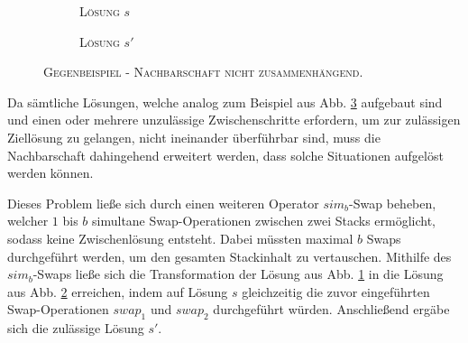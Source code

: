 \begin{figure}[H]
  \begin{subfigure}[b]{0.5\textwidth}
  \centering
    \caption{\textsc{Lösung $s$}}
    \label{fig:counter_a}
  \end{subfigure}
  \hfill
  \begin{subfigure}[b]{0.5\textwidth}
  \centering
    \caption{\textsc{Lösung $s'$}}
    \label{fig:counter_b}
  \end{subfigure}
  \caption{\textsc{Gegenbeispiel - Nachbarschaft nicht zusammenhängend.}}
  \label{fig:counter_example_stacks}
\end{figure}

Da sämtliche Lösungen, welche analog zum Beispiel aus Abb. \ref{fig:counter_example_stacks} aufgebaut sind und einen oder mehrere unzulässige Zwischenschritte erfordern, um zur zulässigen Ziellösung zu gelangen, nicht ineinander überführbar sind, muss die Nachbarschaft dahingehend erweitert werden, dass solche Situationen aufgelöst werden können.

Dieses Problem ließe sich durch einen weiteren Operator $sim_b$-Swap beheben, welcher $1$ bis $b$ simultane Swap-Operationen
zwischen zwei Stacks ermöglicht, sodass keine Zwischenlösung entsteht.
Dabei müssten maximal $b$ Swaps durchgeführt werden, um den gesamten Stackinhalt zu vertauschen.
Mithilfe des $sim_b$-Swaps ließe sich die Transformation der Lösung aus Abb. \ref{fig:counter_a} in die Lösung aus Abb. \ref{fig:counter_b} erreichen, indem auf Lösung $s$ gleichzeitig die zuvor eingeführten Swap-Operationen $swap_1$ und $swap_2$ durchgeführt würden.
Anschließend ergäbe sich die zulässige Lösung $s'$.

